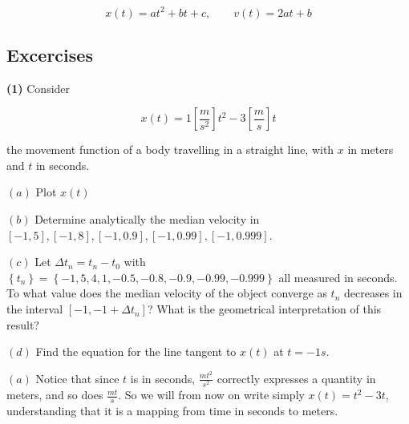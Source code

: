 \documentclass[12pt]{article}
\theoremstyle{definition}
\begin{document}
\begin{equation*}
    x(t) = at^2 + b t + c, \qquad v(t) = 2at + b
\end{equation*}

\pagebreak
\subsection{Excercises}

\begin{shaded}
    \textbf{(1)} Consider 

    \begin{equation*}
        x(t) = 1 \left[ \frac{m}{s^2} \right] t^2 - 3 \left[ \frac{m}{s} \right]
        t
    \end{equation*}

    the movement function of a body travelling in a straight line, with $x$ 
    in meters and $t$ in seconds. 

    $(a)$ Plot $x(t)$

    $(b)$ Determine analytically the median velocity in $[-1, 5], [-1, 8], [-1,
    0.9], [-1, 0.99], [ -1, 0.999]$.

    $(c)$ Let $\Delta t_n = t_n - t_0$ with $\left\{ t_n \right\} = \left\{ -1,
    5, 4, 1, -0.5, -0.8, -0.9, - 0.99, -0.999\right\}  $ all measured in
    seconds. To what value does the median velocity of the object converge as
    $t_n$ decreases in the interval $[-1, -1 + \Delta t_n]$? What is the
    geometrical interpretation of this
    result? 

    $(d)$ Find the equation for the line tangent to $x(t)$ at $t = -1 s$.
\end{shaded}

$(a)$ Notice that since $t$ is in seconds, $\frac{mt^2}{s^2}$ correctly
expresses a quantity in meters, and so does $\frac{mt}{s}$. So we will from now
on write simply $x(t) = t^2 - 3t$, understanding that it is a mapping from time
in seconds to meters.

\end{document}
